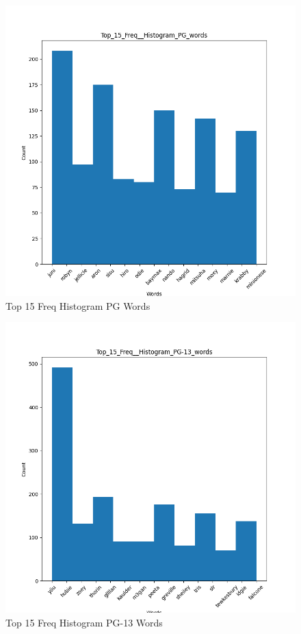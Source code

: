 \documentclass[a4paper]{article}
\begin{document}
\begin{figure}[ht]
    \centering
    \includegraphics[width=1\textwidth]{../stats/Top_15_Freq__Histogram_PG_Words.png}
    \caption{Top 15 Freq Histogram PG Words}
\end{figure}

\begin{figure}[ht]
    \centering
    \includegraphics[width=1\textwidth]{../stats/Top_15_Freq__Histogram_PG-13_Words.png}
    \caption{Top 15 Freq Histogram PG-13 Words}
\end{figure}
\end{document}
